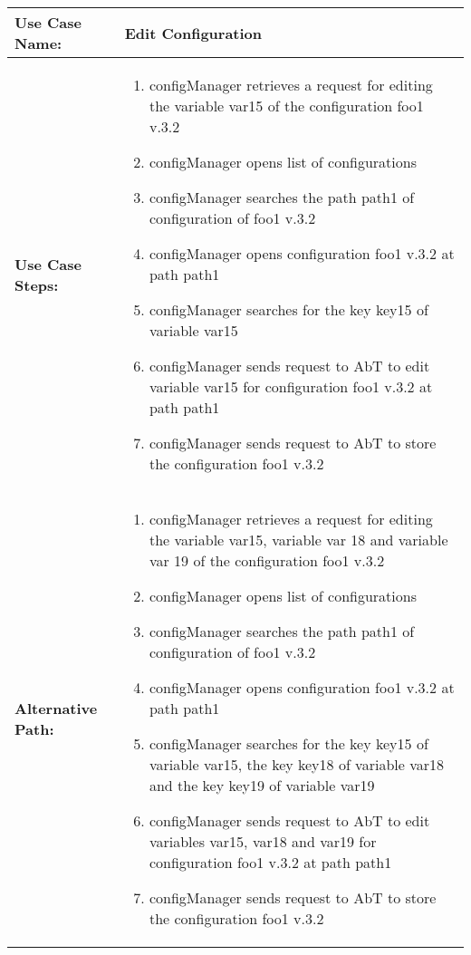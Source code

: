 
\begin{tabularx}{\linewidth}{|l|X|}
\hline
\textbf{Use Case Name:} & \textbf{Edit Configuration} \\
\hline
\textbf{Use Case Steps:} & 
\begin{minipage}{\linewidth} 
  \vspace{0.05em}
  \begin{enumerate}
	\item configManager retrieves a request for editing the variable var15 of the configuration foo1 v.3.2
	\item configManager opens list of configurations
	\item configManager searches the path path1 of configuration of foo1 v.3.2
	\item configManager opens configuration foo1 v.3.2 at path path1
	\item configManager searches for the key key15 of variable var15
	\item configManager sends request to AbT to edit variable var15 for configuration foo1 v.3.2 at path path1
	\item configManager sends request to AbT to store the configuration foo1 v.3.2 
  \end{enumerate}
  \vspace{0.05em}
\end{minipage}
\\
\hline 
\textbf{Alternative Path:} &
\begin{minipage}{\linewidth}
  \vspace{0.05em}
  \begin{enumerate}
	\item configManager retrieves a request for editing the variable var15, variable var 18 and variable var 19 of the configuration foo1 v.3.2
	\item configManager opens list of configurations
	\item configManager searches the path path1 of configuration of foo1 v.3.2
	\item configManager opens configuration foo1 v.3.2 at path path1
	\item configManager searches for the key key15 of variable var15, the key key18 of variable var18 and the key key19 of variable var19
	\item configManager sends request to AbT to edit variables var15, var18 and var19 for configuration foo1 v.3.2 at path path1
	\item configManager sends request to AbT to store the configuration foo1 v.3.2 
  \end{enumerate}
  \vspace{0.05em} 
\end{minipage}
\\
\hline
\end{tabularx}


